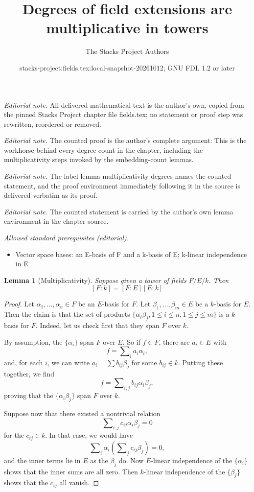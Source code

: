 \documentclass[10pt,a4paper]{amsart}
\title{Degrees of field extensions are multiplicative in towers}
\author{The Stacks Project Authors}
\date{stacks-project:fields.tex:local-snapshot-20261012; GNU FDL 1.2 or later}
\theoremstyle{plain}
\newtheorem{lemma}[subsection]{Lemma}
\theoremstyle{definition}
\theoremstyle{remark}
\numberwithin{equation}{subsection}
\begin{document}
\maketitle
\noindent\textit{Editorial note.} All delivered mathematical text is the author's own, copied from the pinned Stacks Project chapter file fields.tex; no statement or proof step was rewritten, reordered or removed.\par\medskip
\noindent\textit{Editorial note.} The counted proof is the author's complete argument: This is the workhorse behind every degree count in the chapter, including the multiplicativity steps invoked by the embedding-count lemmas.\par\medskip
\noindent\textit{Editorial note.} The label lemma-multiplicativity-degrees names the counted statement, and the proof environment immediately following it in the source is delivered verbatim as its proof.\par\medskip
\noindent\textit{Editorial note.} The counted statement is carried by the author's own lemma environment in the chapter source.\par\medskip
\noindent\textit{Allowed standard prerequisites (editorial).}\begin{itemize}
\item Vector space bases: an E-basis of F and a k-basis of E; k-linear independence in E
\end{itemize}\medskip
\begin{lemma}[Multiplicativity]
\label{lemma-multiplicativity-degrees}
Suppose given a tower of fields $F/E/k$. Then
$$
[F:k] = [F:E][E:k]
$$
\end{lemma}

\begin{proof}
Let $\alpha_1, \ldots, \alpha_n \in F$ be an $E$-basis for $F$. Let
$\beta_1, \ldots, \beta_m \in E$ be a $k$-basis for $E$. Then the claim is
that the set of products
$\{\alpha_i \beta_j, 1 \leq i \leq n, 1 \leq j \leq m\}$
is a $k$-basis for $F$. Indeed, let us check first that they span $F$ over $k$.

\medskip\noindent
By assumption, the $\{\alpha_i\}$ span $F$ over $E$. So if
$f \in F$, there are $a_i \in E$ with
$$
f = \sum\nolimits_i a_i \alpha_i,
$$
and, for each $i$, we can write $a_i = \sum b_{ij} \beta_j$ for some
$b_{ij} \in k$. Putting these together, we find
$$
f = \sum\nolimits_{i,j} b_{ij} \alpha_i \beta_j,
$$
proving that the $\{\alpha_i \beta_j\}$ span $F$ over $k$.

\medskip\noindent
Suppose now that there existed a nontrivial relation
$$
\sum\nolimits_{i,j} c_{ij} \alpha_i \beta_j = 0
$$
for the $c_{ij} \in k$. In that case, we would have
$$
\sum\nolimits_i \alpha_i \left( \sum\nolimits_j c_{ij} \beta_j \right) = 0,
$$
and the inner terms lie in $E$ as the $\beta_j$ do. Now $E$-linear
independence of the $\{\alpha_i\}$ shows that the inner sums are all zero.
Then $k$-linear independence of the $\{\beta_j\}$ shows that the
$c_{ij}$ all vanish.
\end{proof}
\end{document}
